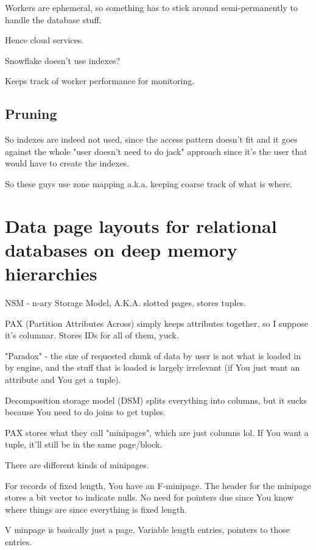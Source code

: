 \documentclass{article}
\begin{document}
		Workers are ephemeral, so something has to stick around semi-permanently to handle the database stuff.
		
		Hence cloud services.
		
		Snowflake doesn't use indexes? 
		
		Keeps track of worker performance for monitoring.
		
	\subsection{Pruning}
	
		So indexes are indeed not used, since the access pattern doesn't fit and it goes against the whole "user doesn't need to do jack" approach since it's the user that would have to create the indexes.
		
		So these guys use zone mapping a.k.a. keeping coarse track of what is where.
	
	
	
			
\newpage
\section{Data page layouts for relational databases on deep memory hierarchies}

	NSM - n-ary Storage Model, A.K.A. slotted pages, stores tuples.
	
	PAX (Partition Attributes Across) simply keeps attributes together, so I suppose it's columnar. Stores IDs for all of them, yuck.
	
	"Paradox" - the size of requested chunk of data by user is not what is loaded in by engine, and the stuff that is loaded is largely irrelevant (if You just want an attribute and You get a tuple).
	
	Decomposition storage model (DSM) splits everything into columns, but it sucks because You need to do joins to get tuples.
	
	PAX stores what they call "minipages", which are just columns lol. If You want a tuple, it'll still be in the same page/block.
	
	There are different kinds of minipages.
	
	For records of fixed length, You have an F-minipage. The header for the minipage stores a bit vector to indicate nulls. No need for pointers due since You know where things are since everything is fixed length.
	
	V minpage is basically just a page. Variable length entries, pointers to those entries.
	
\end{document}
